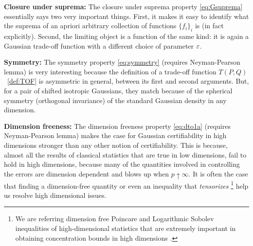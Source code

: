 \par
\textbf{Closure under suprema:} The closure under suprema property \eqref{eq:Gsuprema} essentially says two very important things. First, it makes it easy to identify what the suprema of an apriori arbitrary collection of functions $\{f_i\}_i$ is (in fact explicitly). Second, the limiting object is a function of the same kind: it is again a Gaussian trade-off function with a different choice of parameter $\varepsilon$.
\par
\textbf{Symmetry:} The symmetry property  \eqref{eq:symmetry}  (requires Neyman-Pearson lemma) is very interesting because the definition of a trade-off function $T(P,Q)$ ~\ref{def:TOF} is asymmetric in general, between its first and second arguments.  But, for a pair of shifted isotropic Gaussians, they match because of the spherical symmetry (orthogonal invariance) of the standard Gaussian density in any dimension.
\par
\textbf{Dimension freeness:} The dimension freeness property \eqref{eq:dto1a}  (requires Neyman-Pearson lemma)  makes the case for Gaussian certifiability in high dimensions stronger than any other notion of certifiability. This is because, almost all the results of classical statistics that are true in low dimensions, fail to hold in high dimensions, because many of the quantities involved in controlling the errors are dimension dependent and blows up when $p \uparrow \infty$. It is often the case that finding a dimension-free quantity or even an inequality that \textit{tensorizes} \footnote{We are referring dimension free Poincare and Logarithmic Sobolev inequalities of high-dimensional statistics that are extremely important in obtaining concentration bounds in high dimensions \cite{vanhandelAPC550}.} help us resolve high dimensional issues.


